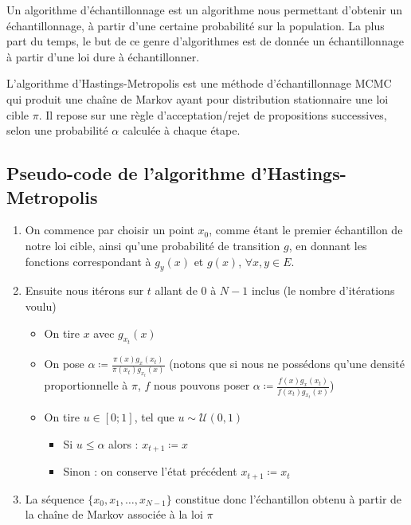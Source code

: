 \documentclass{article}
\begin{document}
\begin{tcolorbox}[colback=white,colframe=blue!80!black,title=Algorithme d'échantillonnage]
Un algorithme d'échantillonnage est un algorithme nous permettant d'obtenir un échantillonnage, à partir d'une certaine probabilité sur la population.
La plus part du temps, le but de ce genre d'algorithmes est de donnée un échantillonnage à partir d'une loi dure à échantillonner.
\end{tcolorbox}

\begin{tcolorbox}[colback=white,colframe=red!80!black,title=Algorithme d'Hastings-Metropolis]
L'algorithme d'Hastings-Metropolis est une méthode d'échantillonnage MCMC qui produit une chaîne de Markov ayant pour distribution stationnaire une loi cible $\pi$. 
Il repose sur une règle d'acceptation/rejet de propositions successives, selon une probabilité $\alpha$ calculée à chaque étape.
\end{tcolorbox}

\label{description-algo-hast-met}
\subsection{Pseudo-code de l'algorithme d'Hastings-Metropolis}

\begin{tcolorbox}[colback=white,colframe={rgb,255:red,150; green,56; blue,235},title=Procédure Hastings-Metropolis]
\begin{enumerate}
    \item On commence par choisir un point $x_0$, comme étant le premier échantillon de notre loi cible, ainsi qu'une probabilité de transition $g$, en donnant les fonctions correspondant à $g_y(x)$ et $g(x)$, $\forall x,y \in E$.
    \item Ensuite nous itérons sur $t$ allant de 0 à $N-1$ inclus (le nombre d'itérations voulu)
    \begin{itemize}
        \item On tire $x$ avec $g_{x_t}(x)$  
        \item On pose $\alpha \coloneqq \frac{ \pi(x) g_x(x_t)}{\pi(x_t) g_{x_t}(x)}$ (notons que si nous ne possédons qu'une densité proportionnelle à $\pi$, $f$ nous pouvons poser $\alpha \coloneqq \frac{ f(x) g_x(x_t)}{f(x_t) g_{x_t}(x)}$)  
        \item On tire $u \in [0;1]$, tel que $u  \sim \mathcal{U}(0,1)$ 
        \begin{itemize}
            \item Si $u \leqslant \alpha$ alors : $x_{t+1} \coloneqq x$  
            \item Sinon : on conserve l'état précédent $x_{t+1} \coloneqq x_t$  
        \end{itemize}
    \end{itemize}
    \item La séquence $\{x_0,x_1, \ldots ,x_{N-1}\}$ constitue donc l'échantillon obtenu à partir de la chaîne de Markov associée à la loi $\pi$
\end{enumerate}
\end{tcolorbox}
\end{document}
